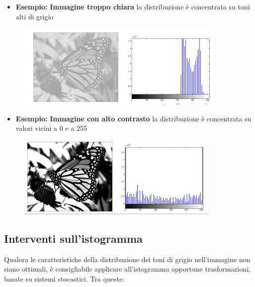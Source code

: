 \begin{itemize}
    \item \textbf{Esempio:} \textbf{Immagine troppo chiara}
          la distribuzione è concentrata su toni alti di grigio
\end{itemize}

\begin{figure}[H]
    \centering
    \includegraphics[width=\linewidth, keepaspectratio]{capitoli/immagini/imgs/isto-chiaro.png}
\end{figure}

\begin{itemize}
    \item \textbf{Esempio:} \textbf{Immagine con alto contrasto}
          la distribuzione è concentrata su valori vicini a 0 e a 255
\end{itemize}

\begin{figure}[H]
    \centering
    \includegraphics[width=\linewidth, keepaspectratio]{capitoli/immagini/imgs/alto-c.png}
\end{figure}

\subsection{Interventi sull'istogramma}
Qualora le caratteristiche della distribuzione dei toni di grigio nell'immagine non siano ottimali, è consigliabile applicare
all'istogramma opportune trasformazioni, basate su sistemi stocastici.
Tra queste:


